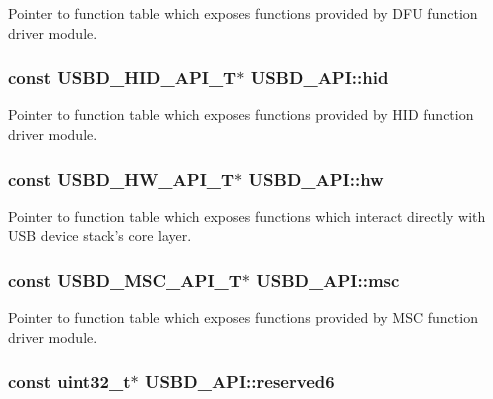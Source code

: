 Pointer to function table which exposes functions provided by D\-F\-U function driver module. \hypertarget{structUSBD__API_add4c43d092004fe92e77152d970e877b}{
\subsubsection[{hid}]{\setlength{\rightskip}{0pt plus 5cm}const {\bf U\-S\-B\-D\-\_\-\-H\-I\-D\-\_\-\-A\-P\-I\-\_\-\-T}$\ast$ U\-S\-B\-D\-\_\-\-A\-P\-I\-::hid}}\label{structUSBD__API_add4c43d092004fe92e77152d970e877b}
Pointer to function table which exposes functions provided by H\-I\-D function driver module. \hypertarget{structUSBD__API_a80f452bd8ff7fdff6fb835beb5e3255c}{
\subsubsection[{hw}]{\setlength{\rightskip}{0pt plus 5cm}const {\bf U\-S\-B\-D\-\_\-\-H\-W\-\_\-\-A\-P\-I\-\_\-\-T}$\ast$ U\-S\-B\-D\-\_\-\-A\-P\-I\-::hw}}\label{structUSBD__API_a80f452bd8ff7fdff6fb835beb5e3255c}
Pointer to function table which exposes functions which interact directly with U\-S\-B device stack's core layer. \hypertarget{structUSBD__API_a0a7fefe527769345f3565fba289c8358}{
\subsubsection[{msc}]{\setlength{\rightskip}{0pt plus 5cm}const {\bf U\-S\-B\-D\-\_\-\-M\-S\-C\-\_\-\-A\-P\-I\-\_\-\-T}$\ast$ U\-S\-B\-D\-\_\-\-A\-P\-I\-::msc}}\label{structUSBD__API_a0a7fefe527769345f3565fba289c8358}
Pointer to function table which exposes functions provided by M\-S\-C function driver module. \hypertarget{structUSBD__API_a4761deeab24d9655d4ab471dee37fe9a}{
\subsubsection[{reserved6}]{\setlength{\rightskip}{0pt plus 5cm}const uint32\-\_\-t$\ast$ U\-S\-B\-D\-\_\-\-A\-P\-I\-::reserved6}}\label{structUSBD__API_a4761deeab24d9655d4ab471dee37fe9a}
